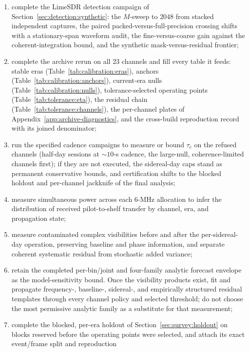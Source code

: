 \begin{enumerate}[leftmargin=2em]
  \item complete the LimeSDR detection campaign of
  Section~\ref{sec:detection:synthetic}: the $M$-sweep to $2048$ from stacked
  independent captures, the paired packed-versus-full-precision crossing shifts
  with a stationary-span waveform audit, the fine-versus-coarse gain against
  the coherent-integration bound, and the synthetic mask-versus-residual
  frontier;
  \item complete the archive rerun on all 23 channels and fill every table it
  feeds: stable eras (Table~\ref{tab:calibration:eras}), anchors
  (Table~\ref{tab:calibration:anchors}), current-era nulls
  (Table~\ref{tab:calibration:nulls}), tolerance-selected operating points
  (Table~\ref{tab:tolerance:eta}), the residual chain
  (Table~\ref{tab:tolerance:channels}), the per-channel plates of
  Appendix~\ref{app:archive-diagnostics}, and the cross-build reproduction
  record with its joined denominator;
  \item run the specified cadence campaigns to measure or bound $\tau_c$ on
  the refused channels (half-day sessions at ${\sim}10$-s cadence, the
  large-null, coherence-limited channels first); if they are not executed, the
  sidereal-day caps stand as permanent conservative bounds, and certification
  shifts to the blocked holdout and per-channel jackknife of the final
  analysis;
  \item measure simultaneous power across each 6-MHz allocation to infer the
  distribution of received pilot-to-shelf transfer by channel, era, and
  propagation state;
  \item measure contaminated complex visibilities before and after the
  per-sidereal-day operation, preserving baseline and phase information, and
  separate coherent systematic residual from stochastic added variance;
  \item retain the completed per-bin/joint and four-family analytic forecast
  envelope as the model-sensitivity bound.  Once the visibility products exist,
  fit and propagate frequency-, baseline-, sidereal-, and empirically structured
  residual templates through every channel policy and selected threshold; do
  not choose the most permissive analytic family as a substitute for that
  measurement;
  \item complete the blocked, per-era holdout of
  Section~\ref{sec:survey:holdout} on blocks reserved before the operating
  points were selected, and attach its exact event/frame split and reproduction

\end{enumerate}
